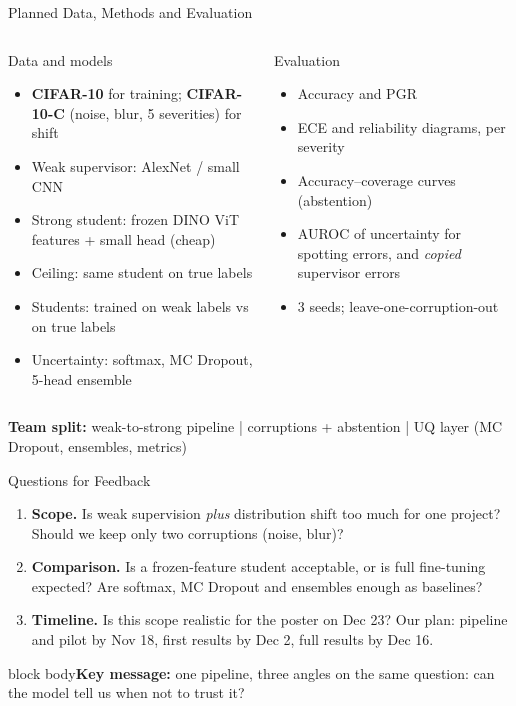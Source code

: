 \documentclass[aspectratio=169,10pt]{beamer}
\newcommand{\keymsg}[1]{%
  \begin{beamercolorbox}[wd=\textwidth,sep=0.7em,rounded=true]{block body}\small\textbf{Key message:} #1\end{beamercolorbox}}
\begin{document}
\begin{frame}{Planned Data, Methods and Evaluation}
\begin{columns}[T]
\begin{block}{Data and models}
\footnotesize
\begin{itemize}
\item \textbf{CIFAR-10} for training; \textbf{CIFAR-10-C} (noise, blur, 5 severities) for shift
\item Weak supervisor: AlexNet / small CNN
\item Strong student: frozen DINO ViT features + small head (cheap)
\item Ceiling: same student on true labels
\item Students: trained on weak labels vs on true labels
\item Uncertainty: softmax, MC Dropout, 5-head ensemble
\end{itemize}
\end{block}
\begin{block}{Evaluation}
\footnotesize
\begin{itemize}
\item Accuracy and PGR
\item ECE and reliability diagrams, per severity
\item Accuracy--coverage curves (abstention)
\item AUROC of uncertainty for spotting errors, and \emph{copied} supervisor errors
\item 3 seeds; leave-one-corruption-out
\end{itemize}
\end{block}
\end{columns}
\vspace{0.4em}
\footnotesize\textbf{Team split:} weak-to-strong pipeline \;|\; corruptions + abstention \;|\; UQ layer (MC Dropout, ensembles, metrics)
\end{frame}

\begin{frame}{Questions for Feedback}
\begin{enumerate}
\item \textbf{Scope.} Is weak supervision \emph{plus} distribution shift too much for one project?
Should we keep only two corruptions (noise, blur)?
\item \textbf{Comparison.} Is a frozen-feature student acceptable, or is full fine-tuning expected?
Are softmax, MC Dropout and ensembles enough as baselines?
\item \textbf{Timeline.} Is this scope realistic for the poster on Dec 23?
Our plan: pipeline and pilot by Nov 18, first results by Dec 2, full results by Dec 16.
\end{enumerate}
\vspace{0.8em}
\keymsg{one pipeline, three angles on the same question: can the model tell us when not to trust it?}
\end{frame}
\end{document}
